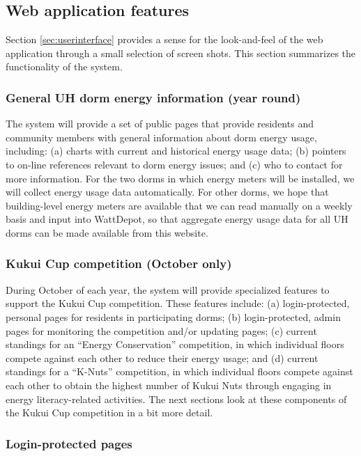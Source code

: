 \documentclass[11pt]{article}
\begin{document}
\subsection{Web application features}
\label{sec:features}

Section \ref{sec:userinterface} provides a sense for the look-and-feel of
the web application through a small selection of screen shots.  This section
summarizes the functionality of the system.

\subsubsection{General UH dorm energy information (year round)}  

The system will provide a set of public pages that provide residents and
community members with general information about dorm energy usage,
including: (a) charts with current and historical energy usage data; (b)
pointers to on-line references relevant to dorm energy issues; and (c) who
to contact for more information.  For the two dorms in which energy meters
will be installed, we will collect energy usage data automatically.  For
other dorms, we hope that building-level energy meters are available that
we can read manually on a weekly basis and input into WattDepot, so that
aggregate energy usage data for all UH dorms can be made available from
this website.

\subsubsection{Kukui Cup competition (October only)}  

During October of each year, the system will provide specialized features
to support the Kukui Cup competition.  These features include: (a)
login-protected, personal pages for residents in participating dorms; (b)
login-protected, admin pages for monitoring the competition and/or updating
pages; (c) current standings for an ``Energy Conservation'' competition, in
which individual floors compete against each other to reduce their energy
usage; and (d) current standings for a ``K-Nuts'' competition, in which
individual floors compete against each other to obtain the highest number
of Kukui Nuts through engaging in energy literacy-related activities.  The
next sections look at these components of the Kukui Cup competition in a
bit more detail.

\subsubsection{Login-protected pages}
 
\end{document}

